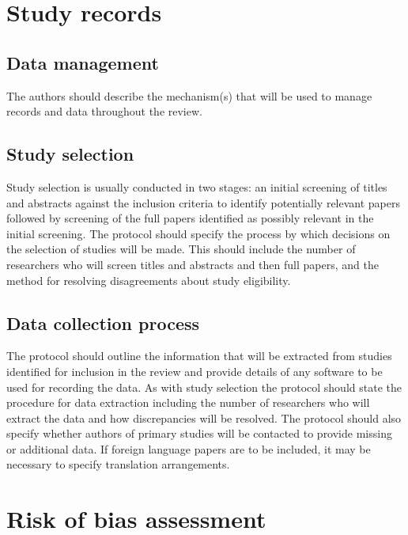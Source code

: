 \documentclass[
  11pt,
  a4paper,
  DIV=11,
  numbers=noendperiod]{scrreprt}
\begin{document}
\section{Study records}\label{study-records}

\subsection{Data management}\label{data-management}

The authors should describe the mechanism(s) that will be used to manage
records and data throughout the review.

\subsection{Study selection}\label{study-selection}

Study selection is usually conducted in two stages: an initial screening
of titles and abstracts against the inclusion criteria to identify
potentially relevant papers followed by screening of the full papers
identified as possibly relevant in the initial screening. The protocol
should specify the process by which decisions on the selection of
studies will be made. This should include the number of researchers who
will screen titles and abstracts and then full papers, and the method
for resolving disagreements about study eligibility.

\subsection{Data collection process}\label{data-collection-process}

The protocol should outline the information that will be extracted from
studies identified for inclusion in the review and provide details of
any software to be used for recording the data. As with study selection
the protocol should state the procedure for data extraction including
the number of researchers who will extract the data and how
discrepancies will be resolved. The protocol should also specify whether
authors of primary studies will be contacted to provide missing or
additional data. If foreign language papers are to be included, it may
be necessary to specify translation arrangements.

\section{Risk of bias assessment}\label{risk-of-bias-assessment}
\end{document}
